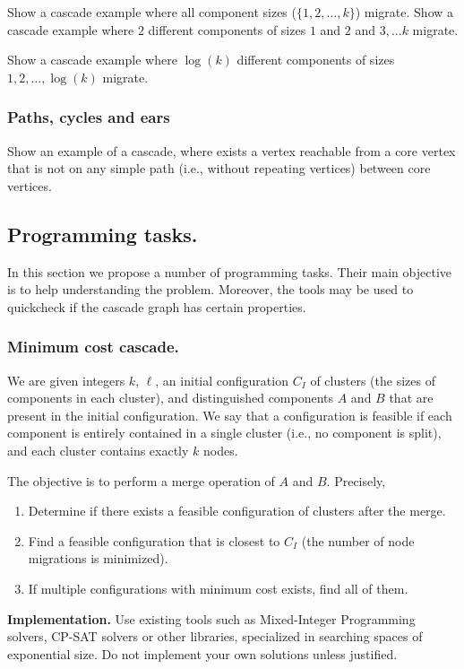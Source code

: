 \documentclass[a4paper,USenglish]{lipics-v2019}
\begin{document}
Show a cascade example where all component sizes ($\{1,2, \ldots, k\}$) migrate.
Show a cascade example where $2$ different components of sizes $1$ and $2$ and $3,\ldots k$ migrate.

Show a cascade example where $\log(k)$ different components of sizes $1, 2, \ldots, \log(k)$ migrate.

\subsubsection{Paths, cycles and ears}


Show an example of a cascade, where exists a vertex reachable from a core vertex that is not on any simple path (i.e., without repeating vertices) between core vertices.


\subsection{Programming tasks.}
In this section we propose a number of programming tasks. Their main objective
is to help understanding the problem. Moreover, the tools may be used to quickcheck 
if the cascade graph has certain properties.


\subsubsection{Minimum cost cascade.}

We are given integers $k$, $\ell$, an initial configuration $C_I$ of clusters (the
sizes of components in each cluster), and distinguished components $A$ and
$B$ that are present in the initial configuration.
We say that a configuration is feasible if each component is entirely contained
in a single cluster (i.e., no component is split), and each cluster contains
exactly $k$ nodes.

The objective is to perform a merge operation of $A$ and $B$. Precisely,
\begin{enumerate}
    \item Determine if there exists a feasible configuration of clusters after
        the merge.
    \item Find a feasible configuration that is closest to $C_I$ (the number of
        node migrations is minimized).
    \item If multiple configurations with minimum cost exists, find all of them.
\end{enumerate}

\noindent
\textbf{Implementation.}
Use existing tools such as Mixed-Integer Programming solvers, CP-SAT solvers or
other libraries, specialized in searching spaces of exponential size.
Do not implement your own solutions unless justified.
\end{document}
